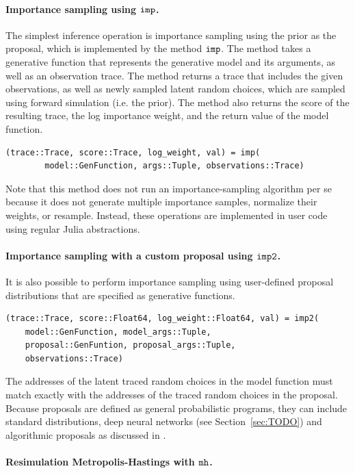 \paragraph{Importance sampling using $\mbox{\texttt{imp}}$.}
The simplest inference operation is importance sampling using the prior as the proposal, which is implemented by the method $\mbox{\texttt{imp}}$.
The method takes a generative function that represents the generative model and its arguments, as well as an observation trace.
The method returns a trace that includes the given observations, as well as newly sampled latent random choices, which are sampled using forward simulation (i.e. the prior).
The method also returns the score of the resulting trace, the log importance weight, and the return value of the model function.
\begin{verbatim}
(trace::Trace, score::Trace, log_weight, val) = imp(
        model::GenFunction, args::Tuple, observations::Trace)
\end{verbatim}
Note that this method does not run an importance-sampling algorithm per se because it does not generate multiple importance samples, normalize their weights, or resample.
Instead, these operations are implemented in user code using regular Julia abstractions.

\paragraph{Importance sampling with a custom proposal using $\mbox{\texttt{imp2}}$.}
It is also possible to perform importance sampling using user-defined proposal distributions that are specified as generative functions.
\begin{verbatim}
(trace::Trace, score::Float64, log_weight::Float64, val) = imp2(
    model::GenFunction, model_args::Tuple,
    proposal::GenFuntion, proposal_args::Tuple, 
    observations::Trace)
\end{verbatim}
The addresses of the latent traced random choices in the model function must match exactly with the addresses of the traced random choices in the proposal.
Because proposals are defined as general probabilistic programs, they can include standard distributions, deep neural networks (see Section~\ref{sec:TODO}) and algorithmic proposals as discussed in \cite{Cusumano2016}.

\paragraph{Resimulation Metropolis-Hastings with $\mbox{\texttt{mh}}$.}


